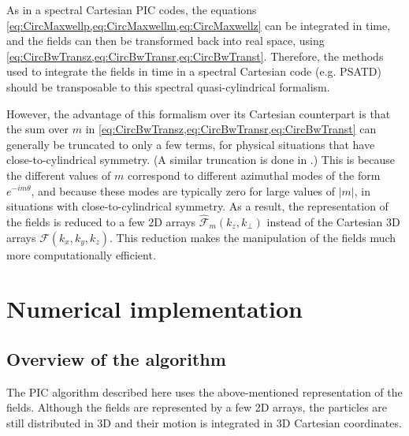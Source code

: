 \documentclass[1p,times]{elsarticle}
\newcommand{\spectral}[1]{\hat{\mathcal{#1}}}
\begin{document}
As in a spectral Cartesian PIC codes, the equations
\cref{eq:CircMaxwellp,eq:CircMaxwellm,eq:CircMaxwellz}  
can be integrated in time, and the fields can then be transformed back into
real space, using \cref{eq:CircBwTransz,eq:CircBwTransr,eq:CircBwTranst}. Therefore,
the methods used to integrate the fields in time in a spectral Cartesian
code (e.g. PSATD) should be transposable to this spectral quasi-cylindrical formalism.

However, the advantage of this formalism over its Cartesian
counterpart is that the sum over $m$ in
\cref{eq:CircBwTransz,eq:CircBwTransr,eq:CircBwTranst} can generally
be truncated to only a few terms, for physical situations that have
close-to-cylindrical symmetry. (A similar truncation is done in \citep{Lifschitz}.) This is because the
different values of $m$ correspond to different azimuthal modes of the
form $e^{-im\theta}$, and because these modes are typically zero for
large values of $|m|$, in situations with close-to-cylindrical symmetry.
As a result, the representation of the fields is
reduced to a few 2D arrays $\spectral{F}_m(k_z,k_\perp )$ instead of the
Cartesian 3D arrays $\mathcal{F}(k_x,k_y,k_z)$. This reduction makes
the manipulation of the fields much more computationally efficient.

\section{Numerical implementation}
\label{sec:implementation}

\subsection{Overview of the algorithm}

The PIC algorithm described here uses the above-mentioned representation
of the fields. Although the fields are represented by a few
2D arrays, the particles are still distributed in 3D and their motion
is integrated in 3D Cartesian coordinates. 
\end{document}
